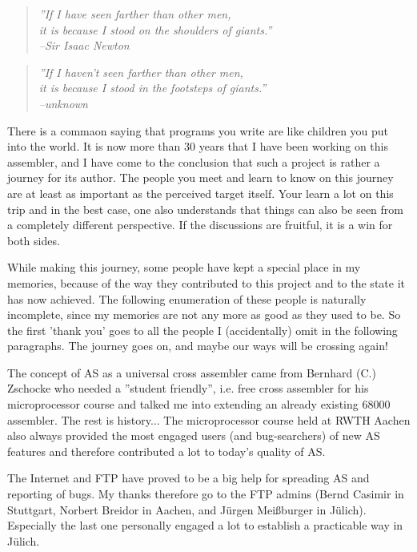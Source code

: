 \documentclass[12pt,twoside]{report}
\newcommand{\asname}{{AS}}
\begin{document}
\begin{quote}\it
''If I have seen farther than other men, \\
it is because I stood on the shoulders of giants.'' \\
\hspace{2cm} --Sir Isaac Newton
\rm\end{quote}
\begin{quote}\it
''If I haven't seen farther than other men, \\
it is because I stood in the footsteps of giants.'' \\
\hspace{2cm} --unknown
\rm\end{quote}
\par
There is a commaon saying that programs you write are like children
you put into the world.  It is now more than 30 years that I have been
working on this assembler, and I have come to the conclusion that such
a project is rather a journey for its author.  The people you meet
and learn to know on this journey are at least as important as the perceived
target itself.  Your learn a lot on this trip and in the best case, one
also understands that things can also be seen from a completely different
perspective.  If the discussions are fruitful, it is a win for both sides.
\par
While making this journey, some people have kept a special place in my
memories, because of the way they contributed to this project and to the
state it has now achieved.  The following enumeration of these people is
naturally incomplete, since my memories are not any more as good as they used
to be.  So the first 'thank you' goes to all the people I (accidentally)
omit in the following paragraphs.  The journey goes on, and maybe our
ways will be crossing again!
\par
The concept of \asname{} as a universal cross assembler came from Bernhard
(C.) Zschocke who needed a ''student friendly'', i.e. free cross
assembler for his microprocessor course and talked me into extending
an already existing 68000 assembler.  The rest is history...
The microprocessor course held at RWTH Aachen also always provided the
most engaged users (and bug-searchers) of new \asname{} features and
therefore contributed a lot to today's quality of \asname{}.

The Internet and FTP have proved to be a big help for spreading \asname{} and
reporting of bugs.  My thanks therefore go to the FTP admins (Bernd
Casimir in Stuttgart, Norbert Breidor in Aachen, and J\"urgen Mei\ss\-burger
in J\"ulich).  Especially the last one personally engaged a lot to
establish a practicable way in J\"ulich.
\end{document}
